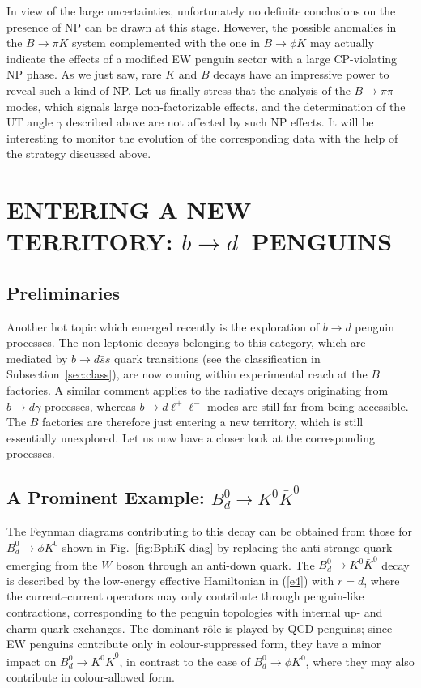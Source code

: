 \documentclass[12pt]{article}
\begin{document}
In view of the large uncertainties, unfortunately no definite conclusions on the
presence of NP can be drawn at this stage. However, the possible anomalies
in the $B\to\pi K$ system complemented with the one in $B\to\phi K$ may actually
indicate the effects of a modified EW penguin sector with a large CP-violating
NP phase. As we just saw, rare $K$ and $B$ decays have an impressive power
to reveal such a kind of NP. Let us finally stress that the analysis of the $B\to\pi\pi$
modes, which signals large non-factorizable effects, and the determination of the 
UT angle $\gamma$ described above are not affected by such NP effects. It will 
be interesting to monitor the evolution of the corresponding data with the help
of the strategy discussed above.



%
%
%
\section{ENTERING A NEW TERRITORY: 
\boldmath$b\to d$\unboldmath~PENGUINS}\label{sec:bd-pengs}
\setcounter{equation}{0}
%
%
%
\subsection{Preliminaries}
%
%
%
Another hot topic which emerged recently is the exploration of 
$b\to d$ penguin processes. The non-leptonic decays belonging
to this category, which are mediated by $b\to d \bar s s$ quark transitions 
(see the classification in Subsection~\ref{sec:class}), are now coming 
within experimental reach at the $B$ factories. A similar comment applies 
to the radiative decays originating from $b\to d\gamma$ processes, whereas
$b\to d\ell^+\ell^-$ modes are still far from being accessible. The $B$ factories
are therefore just entering a new territory, which is still essentially unexplored.
Let us now have a closer look at the corresponding processes.

%
%
%
\boldmath
\subsection{A Prominent Example: $B^0_d\to K^0\bar K^0$}
\unboldmath
%
%
%
The Feynman diagrams contributing to this decay can 
be obtained from those for $B^0_d\to\phi K^0$ shown in 
Fig.~\ref{fig:BphiK-diag} by replacing the anti-strange quark emerging from the 
$W$ boson through an anti-down quark. The $B^0_d\to K^0\bar K^0$ 
decay is described by the low-energy effective Hamiltonian in (\ref{e4}) with $r=d$, 
where the current--current operators may only contribute  through penguin-like 
contractions, corresponding to the penguin topologies with internal up- and
charm-quark exchanges. The dominant r\^ole is played by QCD penguins; 
since EW penguins contribute only in colour-suppressed form, they have a minor 
impact on $B^0_d\to K^0\bar K^0$, in contrast to the case of $B^0_d\to\phi K^0$,
where they may also contribute in colour-allowed form. 
\end{document}
